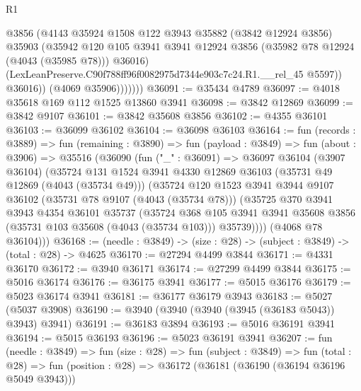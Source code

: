 \begin{lexlean}{R1}
\begin{coremodule}
                    @3856
                    (@4143
                      @35924
                      @1508
                      @122
                      @3943
                      @35882
                      (@3842 @12924 @3856)
                      @35903
                      (@35942
                        @120
                        @105
                        @3941
                        @3941
                        @12924
                        @3856
                        (@35982 @78 @12924 (@4043 (@35985 @78)))
                        @36016)
                      (LexLeanPreserve.C90f788ff96f0082975d7344e903c7c24.R1.__rel_45 @5597))
                    @36016))
                (@4069 @35906)))))))
@36091 := @35434 @4789
@36097 := @4018 @35618 @169 @112 @1525 @13860 @3941
@36098 := @3842 @12869
@36099 := @3842 @9107
@36101 := @3842 @35608 @3856
@36102 := @4355 @36101
@36103 := @36099 @36102
@36104 := @36098 @36103
@36164 := fun (records : @3889) =>
  fun (remaining : @3890) =>
  fun (payload : @3849) =>
  fun (about : @3906) =>
  @35516
    (@36090
      (fun ("_" : @36091) =>
      @36097
        @36104
        (@3907 @36104)
        (@35724
          @131
          @1524
          @3941
          @4330
          @12869
          @36103
          (@35731 @49 @12869 (@4043 (@35734 @49)))
          (@35724
            @120
            @1523
            @3941
            @3944
            @9107
            @36102
            (@35731 @78 @9107 (@4043 (@35734 @78)))
            (@35725
              @370
              @3941
              @3943
              @4354
              @36101
              @35737
              (@35724
                @368
                @105
                @3941
                @3941
                @35608
                @3856
                (@35731 @103 @35608 (@4043 (@35734 @103)))
                @35739))))
        (@4068 @78 @36104)))
@36168 := (needle : @3849) -> (size : @28) -> (subject : @3849) -> (total : @28) -> @4625
@36170 := @27294 @4499 @3844
@36171 := @4331 @36170
@36172 := @3940 @36171
@36174 := @27299 @4499 @3844
@36175 := @5016 @36174
@36176 := @36175 @3941
@36177 := @5015 @36176
@36179 := @5023 @36174 @3941
@36181 := @36177 @36179 @3943
@36183 := @5027 (@5037 @3908)
@36190 := @3940 (@3940 (@3940 (@3945 (@36183 @5043)) @3943) @3941)
@36191 := @36183 @3894
@36193 := @5016 @36191 @3941
@36194 := @5015 @36193
@36196 := @5023 @36191 @3941
@36207 := fun (needle : @3849) =>
  fun (size : @28) =>
  fun (subject : @3849) =>
  fun (total : @28) => fun (position : @28) => @36172 (@36181 (@36190 (@36194 @36196 @5049 @3943)))

\end{coremodule}
\end{lexlean}
